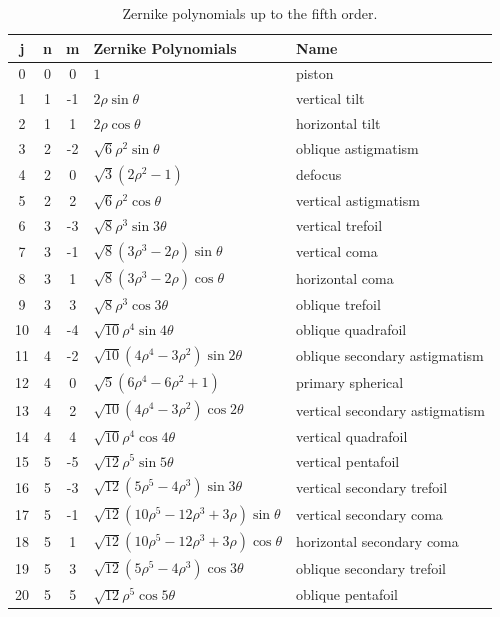 \begin{table}[!b]
\centering
\caption{Zernike polynomials up to the fifth order.}
\label{table:Zpoly}
\begin{tabular}{cccll}
\hline
{\bf j} & {\bf n} & {\bf m} & {\bf Zernike Polynomials}	& {\bf Name}	\\ \hline

0	& 0	& 0		& $1$                            					& piston							\\
1	& 1	& -1	& $2\rho \sin\theta $								& vertical tilt						\\
2	& 1	& 1		& $2\rho \cos\theta $								& horizontal tilt					\\
3	& 2	& -2	& $\sqrt{6}\rho^2 \sin\theta$						& oblique astigmatism				\\
4	& 2	& 0		& $\sqrt{3}(2\rho^2-1)$								& defocus							\\
5	& 2	& 2		& $\sqrt{6}\rho^2 \cos\theta $						& vertical astigmatism				\\
6	& 3	& -3	& $\sqrt{8}\rho^3 \sin3\theta$ 						& vertical trefoil					\\
7	& 3	& -1	& $\sqrt{8}(3\rho^3-2\rho)\sin\theta$				& vertical coma						\\
8	& 3	& 1		& $\sqrt{8}(3\rho^3-2\rho)\cos\theta$				& horizontal coma					\\
9	& 3	& 3		& $\sqrt{8}\rho^3 \cos3\theta$						& oblique trefoil					\\
10	& 4	& -4	& $\sqrt{10}\rho^4 \sin4\theta$						& oblique quadrafoil				\\
11	& 4	& -2	& $\sqrt{10}(4\rho^4-3\rho^2)\sin2\theta$			& oblique secondary astigmatism		\\
12	& 4	& 0		& $\sqrt{5}(6\rho^4-6\rho^2+1)$						& primary spherical					\\
13	& 4	& 2		& $\sqrt{10}(4\rho^4-3\rho^2)\cos2\theta$			& vertical secondary astigmatism	\\
14	& 4	& 4		& $\sqrt{10}\rho^4 \cos4\theta$						& vertical quadrafoil				\\
15	& 5	& -5	& $\sqrt{12}\rho^5 \sin5\theta$						& vertical pentafoil				\\
16	& 5	& -3	& $\sqrt{12}(5\rho^5-4\rho^3)\sin3\theta$			& vertical secondary trefoil		\\
17	& 5	& -1	& $\sqrt{12}(10\rho^5-12\rho^3+3\rho)\sin\theta$	& vertical secondary coma			\\
18	& 5	& 1		& $\sqrt{12}(10\rho^5-12\rho^3+3\rho)\cos\theta$	& horizontal secondary coma			\\
19	& 5	& 3		& $\sqrt{12}(5\rho^5-4\rho^3)\cos3\theta$			& oblique secondary trefoil			\\
20	& 5	& 5		& $\sqrt{12}\rho^5 \cos5\theta$						& oblique pentafoil					\\ \hline
\end{tabular}
\end{table}


